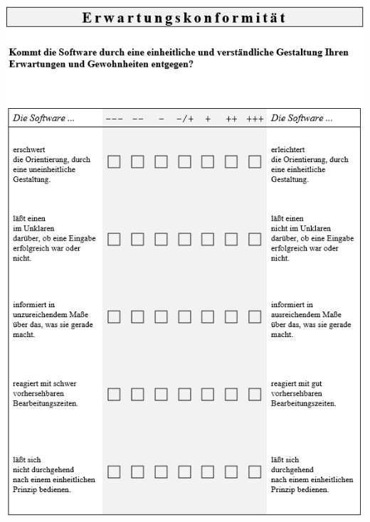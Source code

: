 \bigskip\noindent
\begin{minipage}{\textwidth}
  \centering
  \includegraphics{img/ISO9241-10Fragebogen_S4.PNG}
\end{minipage}

